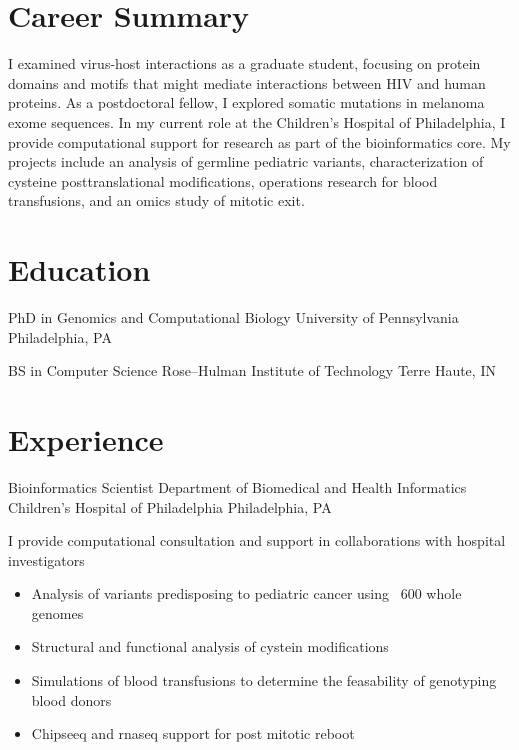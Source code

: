 \documentclass [10pt, letterpaper]{moderncv}
\newcommand\myitem{\item[ $\circ$ ]\hspace*{.1em} }
\begin{document}
\maketitle


\section {Career Summary}
\cvline {} {I examined virus-host interactions as a graduate student, focusing on protein domains and motifs that might mediate interactions between HIV and human proteins. As a postdoctoral fellow, I explored somatic mutations in melanoma exome sequences. In my current role at the Children's Hospital of Philadelphia, I provide computational support for research as part of the bioinformatics core. My projects include an analysis of germline pediatric variants, characterization of cysteine posttranslational modifications, operations research for blood transfusions, and an omics study of mitotic exit.}

\section {Education}


         {PhD in Genomics and Computational Biology}
         {University of Pennsylvania}
         {Philadelphia, PA}
         {}
         {}

         {BS in Computer Science}
         {Rose--Hulman Institute of Technology}
         {Terre Haute, IN}
         {}
         {}

\section {Experience}

         {Bioinformatics Scientist}
         {Department of Biomedical and Health Informatics}
         {Children's Hospital of Philadelphia}
         {Philadelphia, PA}
         {I  provide computational consultation and support in collaborations with  hospital investigators
           \begin{itemize}%
             \setlength{\itemindent}{1.5em}
         \myitem Analysis of variants predisposing to pediatric cancer using ~600 whole genomes
         \myitem Structural and functional analysis of cystein modifications
         \myitem Simulations of blood transfusions to determine the feasability of genotyping blood donors
         \myitem Chipseeq and rnaseq support for post mitotic reboot
           \end{itemize}
           }
\end{document}

